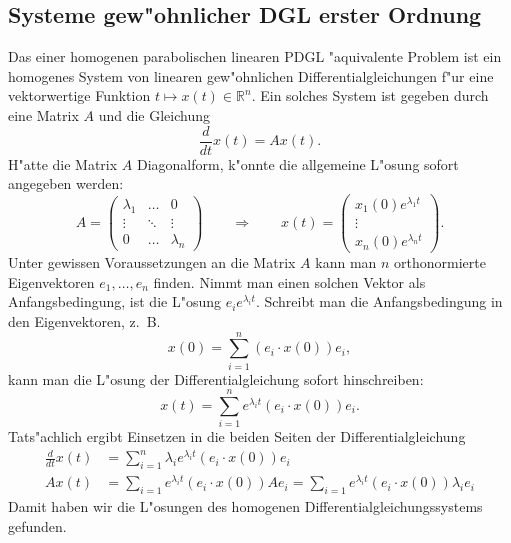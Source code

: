 \subsection{Systeme gew"ohnlicher DGL erster Ordnung}
Das einer homogenen parabolischen linearen PDGL "aquivalente Problem
ist ein homogenes System
von linearen gew"ohnlichen Differentialgleichungen f"ur eine vektorwertige Funktion
$t\mapsto x(t)\in\mathbb R^n$.
Ein solches System ist gegeben durch eine Matrix $A$ und die Gleichung
\[
\frac{d}{dt}x(t)=Ax(t).
\]
H"atte die Matrix $A$ Diagonalform, k"onnte die allgemeine L"osung 
sofort angegeben werden:
\[
A=\begin{pmatrix}
\lambda_1&\dots&0\\
\vdots&\ddots&\vdots\\
0&\dots&\lambda_n
\end{pmatrix}
\qquad\Rightarrow\qquad
x(t)=\begin{pmatrix}
x_1(0)e^{\lambda_1t}
\\
\vdots
\\
x_n(0)e^{\lambda_nt}
\end{pmatrix}.
\]
Unter gewissen Voraussetzungen an die Matrix $A$ kann man $n$
orthonormierte Eigenvektoren
$e_1,\dots,e_n$ finden. Nimmt man einen solchen Vektor als
Anfangsbedingung, ist die L"osung $e_ie^{\lambda_it}$. Schreibt man die
Anfangsbedingung in den Eigenvektoren, z.~B.
\[
x(0)=\sum_{i=1}^n(e_i \cdot x(0))e_i,
\]
kann man die L"osung der Differentialgleichung sofort hinschreiben:
\begin{equation}
x(t)=\sum_{i=1}^n
e^{\lambda_i t}
(e_i\cdot x(0))e_i
.
\label{development}
\end{equation}
Tats"achlich ergibt Einsetzen in die beiden Seiten der Differentialgleichung
\begin{align*}
\frac{d}{dt}x(t)&=\sum_{i=1}^n\lambda_ie^{\lambda_i t}(e_i\cdot x(0))e_i
\\
Ax(t)
&=\sum_{i=1}e^{\lambda_it}(e_i\cdot x(0))Ae_i
=\sum_{i=1}e^{\lambda_it}(e_i\cdot x(0))\lambda_i e_i
\end{align*}
Damit haben wir die L"osungen des homogenen Differentialgleichungssystems
gefunden.

